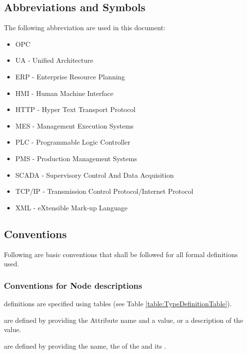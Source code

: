 \subsection{Abbreviations and Symbols}
The following abbreviation are used in this document:
\begin{itemize}
    \item OPC
    \item UA - Unified Architecture
    \item ERP - Enterprise Resource Planning
    \item HMI - Human Machine Interface
    \item HTTP - Hyper Text Transport Protocol
    \item MES - Management Execution Systems
    \item PLC - Programmable Logic Controller
    \item PMS - Production Management Systems
    \item SCADA - Supervisory Control And Data Acquisition
    \item TCP/IP - Transmission Control Protocol/Internet Protocol
    \item XML - eXtensible Mark-up Language
\end{itemize}

\subsection{Conventions}\label{conventions}
Following are basic conventions that shall be followed for all formal definitions used.

\subsubsection{Conventions for Node descriptions}

 definitions are specified using tables (see Table \ref{table:TypeDefinitionTable}).

 are defined by providing the Attribute name and a value, or a description of the value.

 are defined by providing the  name, the  of the  and its .

